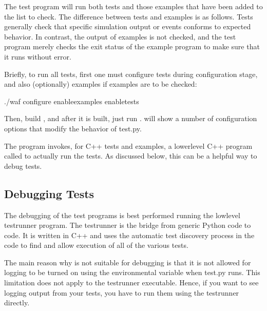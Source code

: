 \documentclass[letterpaper,10pt,english]{sphinxmanual}
\renewcommand{\sphinxcode}[1]{\texttt{\small{#1}}}
\begin{document}
The test program \sphinxcode{} will run both tests and those examples that
have been added to the list to check.  The difference between tests
and examples is as follows.  Tests generally check that specific simulation
output or events conforms to expected behavior.  In contrast, the output
of examples is not checked, and the test program merely checks the exit
status of the example program to make sure that it runs without error.

Briefly, to run all tests, first one must configure tests during configuration
stage, and also (optionally) examples if examples are to be checked:

\begin{sphinxVerbatim}[commandchars=\\\{\}]
\PYGZdl{} ./waf \PYGZhy{}\PYGZhy{}configure \PYGZhy{}\PYGZhy{}enable\PYGZhy{}examples \PYGZhy{}\PYGZhy{}enable\PYGZhy{}tests
\end{sphinxVerbatim}

Then, build , and after it is built, just run \sphinxcode{}.  \sphinxcode{}
will show a number of configuration options that modify the behavior
of test.py.

The program \sphinxcode{} invokes, for C++ tests and examples, a lower\sphinxhyphen{}level
C++ program called \sphinxcode{} to actually run the tests.  As discussed
below, this \sphinxcode{} can be a helpful way to debug tests.


\subsection{Debugging Tests}
\label{\detokenize{test-framework:debugging-tests}}
The debugging of the test programs is best performed running the low\sphinxhyphen{}level
test\sphinxhyphen{}runner program. The test\sphinxhyphen{}runner is the bridge from generic Python
code to  code. It is written in C++ and uses the automatic test
discovery process in the  code to find and allow execution of all
of the various tests.

The main reason why \sphinxcode{} is not suitable for debugging is that it is
not allowed for logging to be turned on using the \sphinxcode{} environmental
variable when test.py runs.  This limitation does not apply to the test\sphinxhyphen{}runner
executable. Hence, if you want to see logging output from your tests, you
have to run them using the test\sphinxhyphen{}runner directly.
\end{document}
